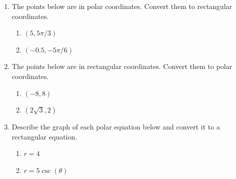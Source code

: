 \documentclass[11pt]{amsart}
\newcommand{\ds}{\displaystyle}
\begin{document}
\begin{enumerate}
\newpage
\item The points below are in polar coordinates. Convert them to rectangular coordinates.
	\begin{enumerate}
	\item $\ds (5, 5 \pi/3)$\\
	\vfill
	\item $\ds (-0.5, -5 \pi /6)$\\
	\vfill
	\end{enumerate}
\item The points below are in rectangular coordinates. Convert them to polar coordinates.
	\begin{enumerate}
	\item $\ds (-8,8)$\\
	\vfill
	\item $\ds (2\sqrt{3},2)$\\
	\vfill
	\end{enumerate}
\item Describe the graph of each polar equation below and convert it to a rectangular equation.	
	\begin{enumerate}
	\item $\ds r=4$\\
	\vfill
	\item $\ds r=5\csc(\theta)$\\
	\vfill
	\end{enumerate}
\end{enumerate}
\end{document}

